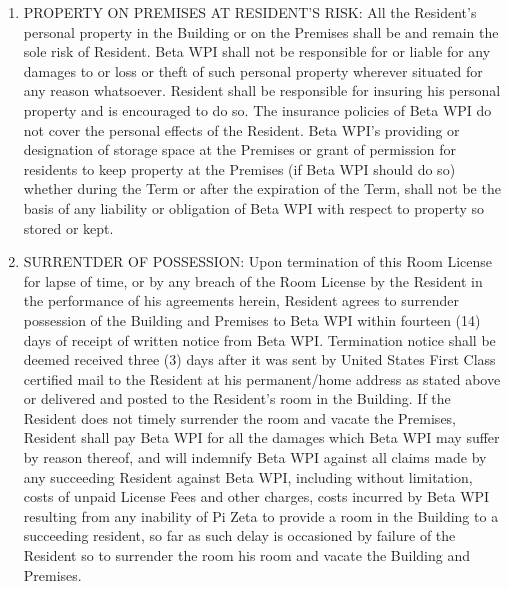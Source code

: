 \documentclass[legalpaper, 12pt]{article} \usepackage{lease}
\begin{document}
\begin{enumerate}
        \item PROPERTY ON PREMISES AT RESIDENT'S RISK: All the Resident’s
                personal property in the Building or on the Premises shall be
                and remain the sole risk of Resident.  Beta WPI shall not be
                responsible for or liable for any damages to or loss or theft of
                such personal property wherever situated for any reason
                whatsoever.  Resident shall be responsible for insuring his
                personal property and is encouraged to do so.  The insurance
                policies of Beta WPI do not cover the personal effects of the
                Resident.  Beta WPI’s providing or designation of storage space
                at the Premises or grant of permission for residents to keep
                property at the Premises (if Beta WPI should do so) whether
                during the Term or after the expiration of the Term, shall not
                be the basis of any liability or obligation of Beta WPI with
                respect to property so stored or kept.

        \item SURRENTDER OF POSSESSION: Upon termination of this Room License
                for lapse of time, or by any breach of the Room License by the
                Resident in the performance of his agreements herein, Resident
                agrees to surrender possession of the Building and Premises to
                Beta WPI within fourteen (14) days of receipt of written notice
                from Beta WPI\@.  Termination notice shall be deemed received
                three (3) days after it was sent by United States First Class
                certified mail to the Resident at his permanent/home address as
                stated above or delivered and posted to the Resident’s room in
                the Building.  If the Resident does not timely surrender the
                room and vacate the Premises, Resident shall pay Beta WPI for
                all the damages which Beta WPI may suffer by reason thereof, and
                will indemnify Beta WPI against all claims made by any
                succeeding Resident against Beta WPI, including without
                limitation, costs of unpaid License Fees and other charges,
                costs incurred by Beta WPI resulting from any inability of Pi
                Zeta to provide a room in the Building to a succeeding resident,
                so far as such delay is occasioned by failure of the Resident so
                to surrender the room his room and vacate the Building  and
                Premises.


\end{enumerate}
\end{document}
